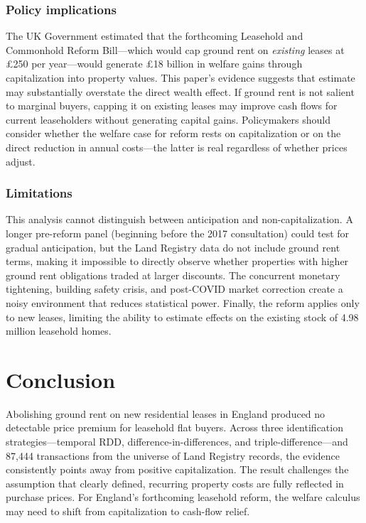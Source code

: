 \documentclass[12pt]{article}
\begin{document}
\subsubsection*{Policy implications} The UK Government estimated that the forthcoming Leasehold and Commonhold Reform Bill---which would cap ground rent on \textit{existing} leases at \pounds 250 per year---would generate \pounds 18 billion in welfare gains through capitalization into property values. This paper's evidence suggests that estimate may substantially overstate the direct wealth effect. If ground rent is not salient to marginal buyers, capping it on existing leases may improve cash flows for current leaseholders without generating capital gains. Policymakers should consider whether the welfare case for reform rests on capitalization or on the direct reduction in annual costs---the latter is real regardless of whether prices adjust.

\subsubsection*{Limitations} This analysis cannot distinguish between anticipation and non-capitalization. A longer pre-reform panel (beginning before the 2017 consultation) could test for gradual anticipation, but the Land Registry data do not include ground rent terms, making it impossible to directly observe whether properties with higher ground rent obligations traded at larger discounts. The concurrent monetary tightening, building safety crisis, and post-COVID market correction create a noisy environment that reduces statistical power. Finally, the reform applies only to new leases, limiting the ability to estimate effects on the existing stock of 4.98 million leasehold homes.

\section{Conclusion}

Abolishing ground rent on new residential leases in England produced no detectable price premium for leasehold flat buyers. Across three identification strategies---temporal RDD, difference-in-differences, and triple-difference---and 87,444 transactions from the universe of Land Registry records, the evidence consistently points away from positive capitalization. The result challenges the assumption that clearly defined, recurring property costs are fully reflected in purchase prices. For England's forthcoming leasehold reform, the welfare calculus may need to shift from capitalization to cash-flow relief.
\end{document}

